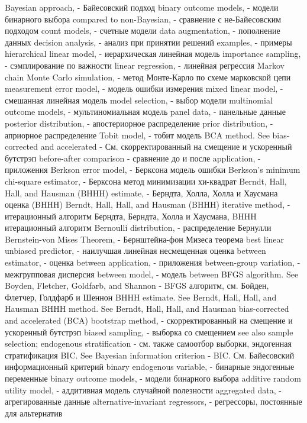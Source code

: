 Bayesian approach, - Байесовский подход
binary outcome models, - модели бинарного выбора
compared to non-Bayesian, - сравнение с не-Байесовским подходом
count models, - счетные модели
data augmentation, - пополнение данных
decision analysis, - анализ при принятии решений
examples, - примеры
hierarchical linear model, - иерархическая линейная модель
importance sampling, - сэмплирование по важности
linear regression, - линейная регрессия
Markov chain Monte Carlo simulation, - метод Монте-Карло по схеме марковской цепи
measurement error model, - модель ошибки измерения
mixed linear model, - смешанная линейная модель
model selection, - выбор модели
multinomial outcome models, - мультиномиальная модель
panel data, - панельные данные
posterior distribution, - апостериорное распределение
prior distribution, - априорное распределение
Tobit model, - тобит модель
BCA method. See bias-corrected and accelerated - См. скорректированный на смещение и ускоренный бутстрэп
before-after comparison - сравнение до и после
application, - приложения
Berkson error model, - Берксона модель ошибки
Berkson’s minimum chi-square estimator, - Берксона метод минимизации хи-квадрат
Berndt, Hall, Hall, and Hausman (BHHH) estimate, - Берндта, Холла, Холла и Хаусмана оценка (BHHH)
Berndt, Hall, Hall, and Hausman (BHHH) iterative method, - итерационный алгоритм Берндта, Берндта, Холла и Хаусмана, BHHH итерационный алгоритм
Bernoulli distribution, - распределение Бернулли 
Bernstein-von Mises Theorem, - Бернштейна-фон Мизеса теорема
best linear unbiased predictor, - наилучшая линейная несмещенная оценка
between estimator, - оценка between
application, - приложения
between-group variation, - межгрупповая дисперсия
between model, - модель between
BFGS algorithm. See Boyden, Fletcher, Goldfarb, and Shannon - BFGS алгоритм, см. Бойден, Флетчер, Голдфарб и Шеннон 
BHHH estimate. See Berndt, Hall, Hall, and Hausman BHHH method. See Berndt, Hall, Hall, and Hausman 
bias-corrected and accelerated (BCA) bootstrap method, - скорректированный на смещение и ускоренный бутстрэп
biased sampling, - выборка со смещением
see also sample selection; endogenous stratification - см. также самоотбор выборки, эндогенная стратификация
BIC. See Bayesian information criterion - BIC. См. Байесовский информационный критерий
binary endogenous variable, - бинарные эндогенные переменные
binary outcome models, - модели бинарного выбора
additive random utility model, - аддитивная модель случайной полезности
aggregated data, - агрегированные данные
alternative-invariant regressors, - регрессоры, постоянные для альтернатив
